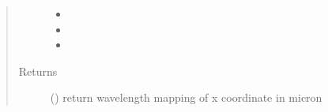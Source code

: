 \documentclass[a4paper,10pt,english]{sphinxmanual}
\begin{document}
\begin{fulllineitems}
\begin{fulllineitems}
\begin{quote}
\begin{description}
\begin{itemize}
\item {} 
 \textendash{} 

\item {} 
 \textendash{} 

\item {} 
 \textendash{} 

\end{itemize}

\item[{Returns}] \leavevmode
{} () \textendash{} return wavelength mapping of x coordinate in micron

\end{description}\end{quote}

\end{fulllineitems}


\end{fulllineitems}

\end{document}

